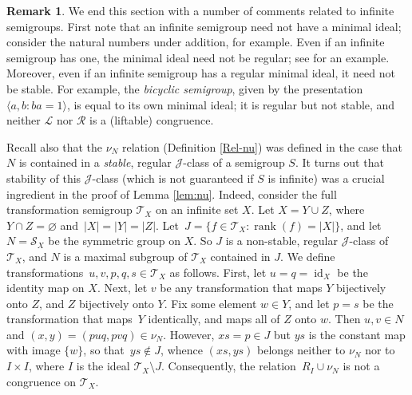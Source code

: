\documentclass[11pt,a4paper]{article}
\renewcommand{\S}{\mathcal S}
\newcommand{\T}{\mathcal T}
\renewcommand{\L}{\mathrel{\mathscr L}}
\newcommand{\R}{\mathrel{\mathscr R}}
\newcommand{\gJ}{\mathrel{\mathscr J}}
\newcommand{\rank}{\operatorname{rank}}
\newcommand{\id}{\operatorname{id}}
\newcommand{\set}[2]{\{ {#1} : {#2} \}}
\renewcommand{\emptyset}{\varnothing}
\newcommand{\1}{\id_n}
\newcommand{\sm}{\setminus}
\newcommand{\la}{\langle}
\newcommand{\ra}{\rangle}
\numberwithin{equation}{section}
\theoremstyle{definition}
\newtheorem{rem}[equation]{Remark}
\begin{document}
\begin{rem}\label{rem:infinite}
We end this section with a number of comments related to infinite semigroups.
%
First note that an infinite semigroup need not have a minimal ideal; consider the natural numbers under addition, for example.
%
Even if an infinite semigroup has one, the minimal ideal need not be regular; see \cite[Chapter 2, Exercise 1]{Howie} for an example.
%
Moreover, even if an infinite semigroup has a regular minimal ideal, it need not be stable.  For example, the \emph{bicyclic semigroup}, given by the presentation $\la a,b:ba=1\ra$, is equal to its own minimal ideal; it is regular but not stable, and neither $\L$ nor $\R$ is a (liftable) congruence.

Recall also that the $\nu_N$ relation (Definition \ref{Rel-nu}) was defined in the case that $N$ is contained in a \emph{stable}, regular $\gJ$-class of a semigroup $S$.  
%
It turns out that stability of this $\gJ$-class (which is not guaranteed if $S$ is infinite) was a crucial ingredient in the proof of Lemma \ref{lem:nu}.  Indeed, consider the full transformation semigroup $\T_X$ on an infinite set $X$.  Let $X=Y\cup Z$, where $Y\cap Z=\emptyset$ and~${|X|=|Y|=|Z|}$.  Let~${J=\set{f\in\T_X}{\rank(f)=|X|}}$, and let $N=\S_X$ be the symmetric group on $X$.  So $J$ is a non-stable, regular $\gJ$-class of~$\T_X$, and $N$ is a maximal subgroup of $\T_X$ contained in $J$.  We define transformations~$u,v,p,q,s\in\T_X$ as follows.  First, let $u=q=\id_X$ be the identity map on $X$.  Next, let $v$ be any transformation that maps $Y$ bijectively onto $Z$, and $Z$ bijectively onto $Y$.  Fix some element $w\in Y$, and let $p=s$ be the transformation that maps~$Y$ identically, and maps all of $Z$ onto $w$.  Then $u,v\in N$ and $(x,y)=(puq,pvq)\in\nu_N$.  However, $xs=p\in J$ but $ys$ is the constant map with image $\{w\}$, so that~$ys\not\in J$, whence $(xs,ys)$ belongs neither to $\nu_N$ nor to $I\times I$, where $I$ is the ideal $\T_X\sm J$.  Consequently, the relation~$R_I\cup\nu_N$ is not a congruence on $\T_X$.
\end{rem}
\end{document}
